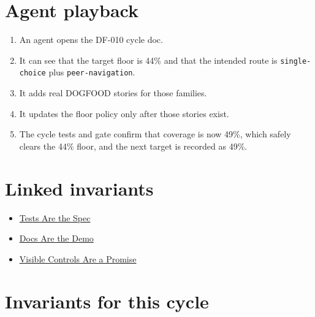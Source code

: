 \section{Agent playback}\label{record-072-agent-playback}

\begin{enumerate}
\def\labelenumi{\arabic{enumi}.}
\tightlist
\item
  An agent opens the DF-010 cycle doc.
\item
  It can see that the target floor is 44\% and that the intended route is \texttt{s\allowbreak{}i\allowbreak{}n\allowbreak{}g\allowbreak{}l\allowbreak{}e\allowbreak{}-\allowbreak{}c\allowbreak{}h\allowbreak{}o\allowbreak{}i\allowbreak{}c\allowbreak{}e} plus \texttt{p\allowbreak{}e\allowbreak{}e\allowbreak{}r\allowbreak{}-\allowbreak{}n\allowbreak{}a\allowbreak{}v\allowbreak{}i\allowbreak{}g\allowbreak{}a\allowbreak{}t\allowbreak{}i\allowbreak{}o\allowbreak{}n}.
\item
  It adds real DOGFOOD stories for those families.
\item
  It updates the floor policy only after those stories exist.
\item
  The cycle tests and gate confirm that coverage is now 49\%, which safely clears the 44\% floor, and the next target is recorded as 49\%.
\end{enumerate}

\section{Linked invariants}\label{record-072-linked-invariants}

\begin{itemize}
\tightlist
\item
  \href{https://github.com/flyingrobots/bijou/blob/cbd70612140e7a450d764b3c7be1c6af878b99bc/docs/invariants/tests-are-the-spec.md}{Tests Are the Spec}
\item
  \href{https://github.com/flyingrobots/bijou/blob/cbd70612140e7a450d764b3c7be1c6af878b99bc/docs/invariants/docs-are-the-demo.md}{Docs Are the Demo}
\item
  \href{https://github.com/flyingrobots/bijou/blob/cbd70612140e7a450d764b3c7be1c6af878b99bc/docs/invariants/visible-controls-are-a-promise.md}{Visible Controls Are a Promise}
\end{itemize}

\section{Invariants for this cycle}\label{record-072-invariants-for-this-cycle}

